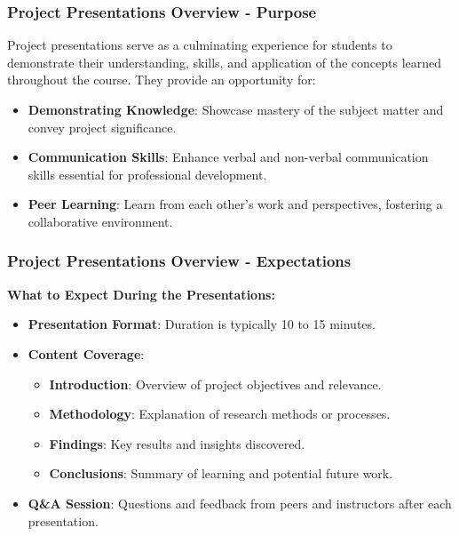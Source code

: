 \documentclass[aspectratio=169]{beamer}
\begin{document}
\begin{frame}[fragile]
    \frametitle{Project Presentations Overview - Purpose}
    Project presentations serve as a culminating experience for students to demonstrate their understanding, skills, and application of the concepts learned throughout the course. They provide an opportunity for:
    \begin{itemize}
        \item \textbf{Demonstrating Knowledge}: Showcase mastery of the subject matter and convey project significance.
        \item \textbf{Communication Skills}: Enhance verbal and non-verbal communication skills essential for professional development.
        \item \textbf{Peer Learning}: Learn from each other’s work and perspectives, fostering a collaborative environment.
    \end{itemize}
\end{frame}

\begin{frame}[fragile]
    \frametitle{Project Presentations Overview - Expectations}
    \textbf{What to Expect During the Presentations:}
    \begin{itemize}
        \item \textbf{Presentation Format}: Duration is typically 10 to 15 minutes.
        \item \textbf{Content Coverage}:
        \begin{itemize}
            \item \textbf{Introduction}: Overview of project objectives and relevance.
            \item \textbf{Methodology}: Explanation of research methods or processes.
            \item \textbf{Findings}: Key results and insights discovered.
            \item \textbf{Conclusions}: Summary of learning and potential future work.
        \end{itemize}
        \item \textbf{Q\&A Session}: Questions and feedback from peers and instructors after each presentation.
    \end{itemize}
\end{frame}
\end{document}

